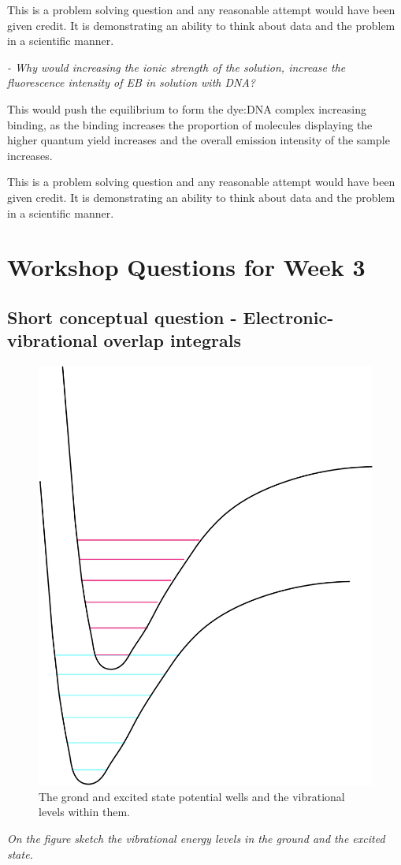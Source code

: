\documentclass[
]{book}
\begin{document}
This is a problem solving question and any reasonable attempt would have been given credit. It is demonstrating an ability to think about data and the problem in a scientific manner.

\emph{- Why would increasing the ionic strength of the solution, increase the fluorescence intensity of EB in solution with DNA?}

This would push the equilibrium to form the dye:DNA complex increasing binding, as the binding increases the proportion of molecules displaying the higher quantum yield increases and the overall emission intensity of the sample increases.

This is a problem solving question and any reasonable attempt would have been given credit. It is demonstrating an ability to think about data and the problem in a scientific manner.

\hypertarget{ch:Workshop3}{%
\chapter{Workshop Questions for Week 3}\label{ch:Workshop3}}

\hypertarget{sec:overlap}{%
\section{Short conceptual question - Electronic-vibrational overlap integrals}\label{sec:overlap}}

\begin{figure}

{\centering \includegraphics[width=0.3\linewidth]{images/overlap} 

}

\caption{The grond and excited state potential wells and the vibrational levels within them.}\label{fig:overlap}
\end{figure}

\emph{On the figure sketch the vibrational energy levels in the ground and the excited state.}
\end{document}
